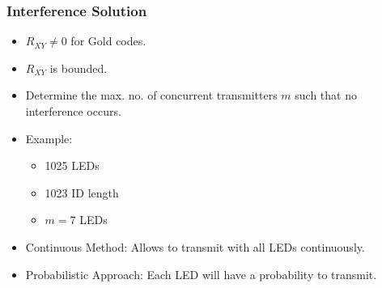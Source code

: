 \documentclass{beamer}
\begin{document}
	\begin{frame}\frametitle{Interference Solution}

		\begin{itemize}

			\item $R_{XY} \neq 0$ for Gold codes.

			\item $R_{XY}$ is bounded.

			\item Determine the max. no. of concurrent transmitters $m$ such that no interference occurs.

			\item Example:
				\begin{itemize}
					\item 1025 LEDs
					\item 1023 ID length
					\item $m = 7$ LEDs
				\end{itemize}

			\item Continuous Method: Allows to transmit with all LEDs continuously.

			\item Probabilistic Approach: Each LED will have a probability to transmit.

		\end{itemize} 








	\end{frame}
\end{document}

